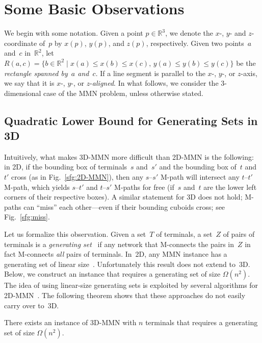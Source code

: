 \documentclass[11pt]{llncs}
\newcommand{\R}{\ensuremath{\mathbb{R}}}
\begin{document}
\section{Some Basic Observations}\label{sec:basic-observations}

We begin with some notation. Given a point $p \in \R^3$, we
denote the $x$-, $y$- and $z$-coordinate of~$p$ by $x(p)$, $y(p)$, and
$z(p)$, respectively.  Given two points~$a$ and~$c$ in~$\R^2$, let
$R(a,c)=\{ b \in \R^2 \mid x(a) \le x(b) \le x(c), \, y(a) \le y(b)
\le y(c) \}$ be the \emph{rectangle spanned by~$a$ and~$c$}.
If a line segment is parallel to the $x$-, $y$-, or $z$-axis, we say
that it is $x$-, $y$-, or $z$-\emph{aligned}.
In what follows, we consider the
3-dimensional case of the MMN problem, unless otherwise stated.

\subsection{Quadratic Lower Bound for Generating Sets in 3D}
\label{sec:generating}

Intuitively, what makes 3D-MMN more difficult than 2D-MMN is the following: 
in 2D, if the bounding box of terminals~$s$ and~$s'$ and the
bounding box of~$t$ and~$t'$ cross (as in Fig.~\ref{sfg:2D-MMN}), then
any $s$--$s'$ M-path will intersect any $t$--$t'$ M-path, which yields
$s$--$t'$ and $t$--$s'$ M-paths for free (if~$s$ and~$t$ are the lower
left corners of their respective boxes).  A similar statement for 3D
does not hold; M-paths can ``miss'' each other---even if their
bounding cuboids cross; see Fig.~\ref{sfg:miss}.

Let us formalize this observation.  Given a set~$T$ of
terminals, a set~$Z$ of pairs of terminals is a \emph{generating
  set}~\cite{kia-iammn-02} if any network that M-connects the pairs
in~$Z$ in fact M-connects \emph{all} pairs of terminals.
In~2D, any MMN instance has a generating set of linear
size~\cite{kia-iammn-02}.  Unfortunately this
result does not extend to~3D.  Below, we construct an
instance that requires a generating set of size $\Omega(n^2)$.
The idea of using linear-size generating sets is 
exploited by several algorithms for
2D-MMN~\cite{cnv-raamm-08,kia-iammn-02}. The following theorem shows that these 
approaches do not easily carry over to~3D.


\begin{theorem}
  There exists an instance of 3D-MMN with $n$ terminals that requires
  a generating set of size $\Omega(n^2)$.
\end{theorem}
\end{document}
